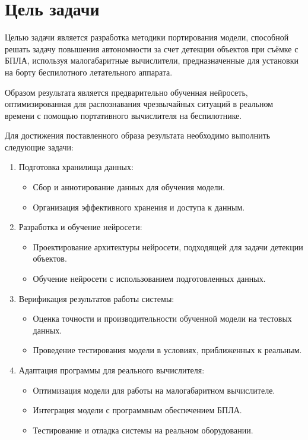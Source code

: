     \section*{Цель задачи}
    
    Целью задачи является разработка методики портирования модели, способной решать задачу повышения автономности за счет детекции объектов при съёмке с БПЛА, используя малогабаритные вычислители, предназначенные для установки на борту беспилотного летательного аппарата.
    
    Образом результата является предварительно обученная нейросеть, оптимизированная для распознавания чрезвычайных ситуаций в реальном времени с помощью портативного вычислителя на беспилотнике.
    
    Для достижения поставленного образа результата необходимо выполнить следующие задачи:
    \begin{enumerate}
        \item Подготовка хранилища данных:
        \begin{itemize}
            \item Сбор и аннотирование данных для обучения модели.
            \item Организация эффективного хранения и доступа к данным.
        \end{itemize}
        
        \item Разработка и обучение нейросети:
        \begin{itemize}
            \item Проектирование архитектуры нейросети, подходящей для задачи детекции объектов.
            \item Обучение нейросети с использованием подготовленных данных.
        \end{itemize}
        
        \item Верификация результатов работы системы:
        \begin{itemize}
            \item Оценка точности и производительности обученной модели на тестовых данных.
            \item Проведение тестирования модели в условиях, приближенных к реальным.
        \end{itemize}
        
        \item Адаптация программы для реального вычислителя:
        \begin{itemize}
            \item Оптимизация модели для работы на малогабаритном вычислителе.
            \item Интеграция модели с программным обеспечением БПЛА.
            \item Тестирование и отладка системы на реальном оборудовании.
        \end{itemize}
    \end{enumerate}

\endinput